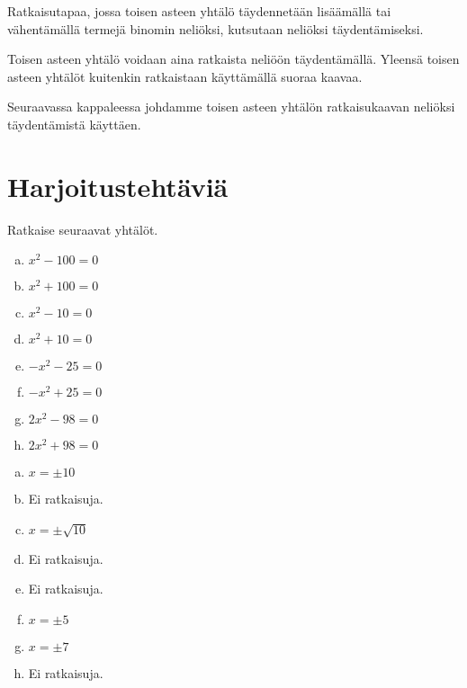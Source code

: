 Ratkaisutapaa, jossa toisen asteen yhtälö täydennetään lisäämällä tai vähentämällä termejä binomin neliöksi, kutsutaan neliöksi täydentämiseksi.

Toisen asteen yhtälö voidaan aina ratkaista neliöön täydentämällä. Yleensä toisen asteen yhtälöt kuitenkin ratkaistaan käyttämällä suoraa kaavaa.

Seuraavassa kappaleessa johdamme toisen asteen yhtälön ratkaisukaavan neliöksi täydentämistä käyttäen.

\section{Harjoitustehtäviä}

\begin{tehtava}
    Ratkaise seuraavat yhtälöt.
    \begin{enumerate}[a)]
        \item $x^2 - 100 = 0$
        \item $x^2 + 100 = 0$
        \item $x^2 - 10 = 0$
        \item $x^2 + 10 = 0$
        \item $-x^2 - 25 = 0$
        \item $-x^2 + 25 = 0$
        \item $2x^2 - 98 = 0$
        \item $2x^2 + 98 = 0$
    \end{enumerate}
    \begin{vastaus}
        \begin{enumerate}[a)]
            \item $x=\pm10$
            \item Ei ratkaisuja.
            \item $x=\pm\sqrt{10}$
            \item Ei ratkaisuja.
            \item Ei ratkaisuja.
            \item $x=\pm5$
            \item $x=\pm7$
            \item Ei ratkaisuja.
        \end{enumerate}
    \end{vastaus}
\end{tehtava}


